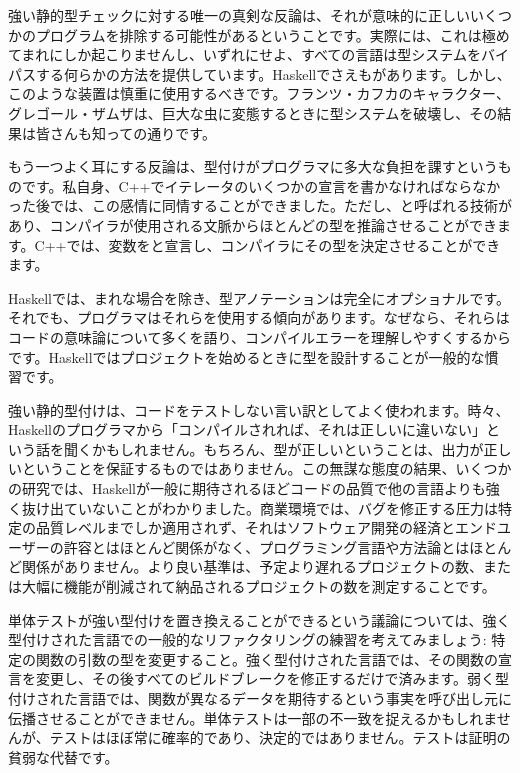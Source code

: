 強い静的型チェックに対する唯一の真剣な反論は、それが意味的に正しいいくつかのプログラムを排除する可能性があるということです。実際には、これは極めてまれにしか起こりませんし、いずれにせよ、すべての言語は型システムをバイパスする何らかの方法を提供しています。Haskellでさえもがあります。しかし、このような装置は慎重に使用するべきです。フランツ・カフカのキャラクター、グレゴール・ザムザは、巨大な虫に変態するときに型システムを破壊し、その結果は皆さんも知っての通りです。

もう一つよく耳にする反論は、型付けがプログラマに多大な負担を課すというものです。私自身、C++でイテレータのいくつかの宣言を書かなければならなかった後では、この感情に同情することができました。ただし、と呼ばれる技術があり、コンパイラが使用される文脈からほとんどの型を推論させることができます。C++では、変数をと宣言し、コンパイラにその型を決定させることができます。

Haskellでは、まれな場合を除き、型アノテーションは完全にオプショナルです。それでも、プログラマはそれらを使用する傾向があります。なぜなら、それらはコードの意味論について多くを語り、コンパイルエラーを理解しやすくするからです。Haskellではプロジェクトを始めるときに型を設計することが一般的な慣習です。

強い静的型付けは、コードをテストしない言い訳としてよく使われます。時々、Haskellのプログラマから「コンパイルされれば、それは正しいに違いない」という話を聞くかもしれません。もちろん、型が正しいということは、出力が正しいということを保証するものではありません。この無謀な態度の結果、いくつかの研究では、Haskellが一般に期待されるほどコードの品質で他の言語よりも強く抜け出ていないことがわかりました。商業環境では、バグを修正する圧力は特定の品質レベルまでしか適用されず、それはソフトウェア開発の経済とエンドユーザーの許容とはほとんど関係がなく、プログラミング言語や方法論とはほとんど関係がありません。より良い基準は、予定より遅れるプロジェクトの数、または大幅に機能が削減されて納品されるプロジェクトの数を測定することです。

単体テストが強い型付けを置き換えることができるという議論については、強く型付けされた言語での一般的なリファクタリングの練習を考えてみましょう: 特定の関数の引数の型を変更すること。強く型付けされた言語では、その関数の宣言を変更し、その後すべてのビルドブレークを修正するだけで済みます。弱く型付けされた言語では、関数が異なるデータを期待するという事実を呼び出し元に伝播させることができません。単体テストは一部の不一致を捉えるかもしれませんが、テストはほぼ常に確率的であり、決定的ではありません。テストは証明の貧弱な代替です。

